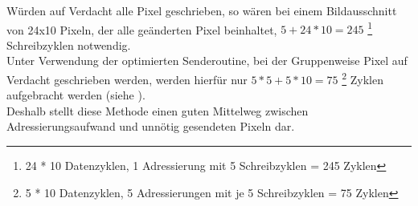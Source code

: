 Würden auf Verdacht alle Pixel geschrieben, so wären bei einem Bildausschnitt von 24x10 Pixeln, der alle geänderten Pixel beinhaltet,  $5 + 24 * 10 = 245$ \footnote{24 * 10 Datenzyklen, 1 Adressierung mit 5 Schreibzyklen = 245 Zyklen} Schreibzyklen notwendig. \\
Unter Verwendung der optimierten Senderoutine, bei der Gruppenweise Pixel auf Verdacht geschrieben werden, werden hierfür nur $5 * 5 + 5 * 10 = 75$ \footnote{5 * 10 Datenzyklen, 5 Adressierungen mit je 5 Schreibzyklen = 75 Zyklen} Zyklen aufgebracht werden (siehe \citep{Schlegel2013a}).\\ Deshalb stellt diese Methode einen guten Mittelweg zwischen Adressierungsaufwand und unnötig gesendeten Pixeln dar. 


	